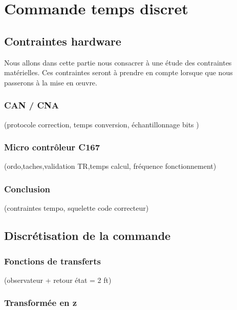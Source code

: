 \chapter{Commande temps discret}

\section{Contraintes hardware} 
	Nous allons dans cette partie nous consacrer à une étude des contraintes matérielles. Ces contraintes seront à prendre en compte lorsque que nous passerons à la mise en œuvre.  
	\subsection{CAN / CNA}
		(protocole correction, temps conversion, échantillonnage bits )				
	\subsection{Micro contrôleur C167}
		(ordo,taches,validation TR,temps calcul, fréquence fonctionnement)
	\subsection{Conclusion}
	  	(contraintes tempo, squelette code correcteur)
\section{Discrétisation de la commande}
	\subsection{Fonctions de transferts}
		 (observateur + retour état = 2 ft)
	\subsection{Transformée en z}